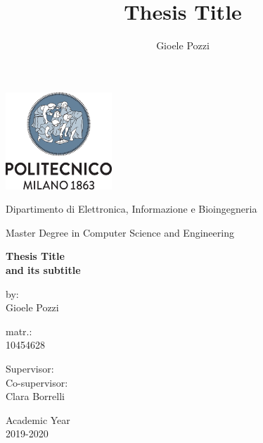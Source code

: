 \documentclass[oneside]{book}
\author{Gioele Pozzi}
\title{Thesis Title}
\begin{document}
\centering
\includegraphics[width=4cm]{../img/logo_polimi.png}

\vspace{1cm}
Dipartimento di Elettronica, Informazione e Bioingegneria

\vspace{0.25cm}
Master Degree in Computer Science and Engineering

\vspace{2cm}
\centering

\color{BrickRed}
\Huge
\textbf{
Thesis Title \\%
\Large and its subtitle}

\normalsize
\vspace{2cm}
\color{black}
\flushright
by:\\Gioele Pozzi

\vspace{0.5cm}
matr.:\\10454628

\vspace{0.5cm}
\flushleft
Supervisor:\\

\vspace{0.5cm}
Co-supervisor:\\ Clara Borrelli



\vfill
\centering
Academic Year \\ 2019-2020

\end{document}
